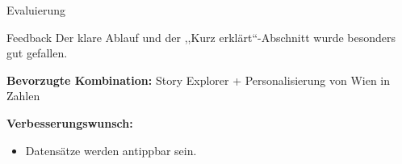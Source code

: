 %
\begin{frame}{Evaluierung}
  \begin{block}{Feedback}
    \vspace{0.5em}
    Der klare Ablauf und der ,,Kurz erkl\"{a}rt``-Abschnitt wurde besonders gut gefallen.
  \end{block}

  \vspace{0.5em}
  \textbf{Bevorzugte Kombination:} Story Explorer + Personalisierung von Wien in Zahlen

  \vspace{0.5em}
  \textbf{Verbesserungswunsch:}
  \begin{itemize}
    \item Datens\"{a}tze werden antippbar sein.
  \end{itemize}
\end{frame}
